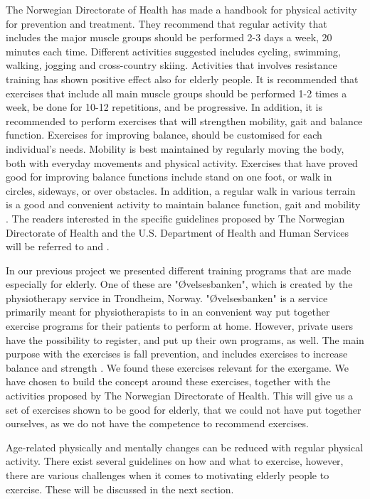 The Norwegian Directorate of Health has made a handbook for physical activity for prevention and treatment. They recommend that regular activity that includes the major muscle groups should be performed 2-3 days a week, 20 minutes each time. Different activities suggested includes cycling, swimming, walking, jogging and cross-country skiing. Activities that involves resistance training has shown positive effect also for elderly people. It is recommended that exercises that include all main muscle groups should be performed 1-2 times a week, be done for 10-12 repetitions, and be progressive. In addition, it is recommended to perform exercises that will strengthen mobility, gait and balance function. Exercises for improving balance, should be customised for each individual's needs. Mobility is best maintained by regularly moving the body, both with everyday movements and physical activity. Exercises that have proved good for improving balance functions include stand on one foot, or walk in circles, sideways, or over obstacles. In addition, a regular walk in various terrain is a good and convenient activity to maintain balance function, gait and mobility \cite{aktivitetsbok}. The readers interested in the specific guidelines proposed by The Norwegian Directorate of Health and the U.S. Department of Health and Human Services will be referred to  \cite{aktivitetsbok} and \cite{guidelines}. 

In our previous project \cite{project} we presented different training programs that are made especially for elderly. One of these are "Øvelsesbanken", which is created by the physiotherapy service in Trondheim, Norway.  "Øvelsesbanken" is a service primarily meant for physiotherapists to in an convenient way put together exercise programs for their patients to perform at home. However, private users have the possibility to register, and put up their own programs, as well. The main purpose with the exercises is fall prevention, and includes exercises to increase balance and strength \cite{eldretrening}. We found these exercises relevant for the exergame. We have chosen to build the concept around these exercises, together with the activities proposed by The Norwegian Directorate of Health. This will give us a set of exercises shown to be good for elderly, that we could not have put together ourselves, as we do not have the competence to recommend exercises.

Age-related physically and mentally changes can be reduced with regular physical activity. There exist several guidelines on how and what to exercise, however, there are various challenges when it comes to motivating elderly people to exercise. These will be discussed in the next section. 

